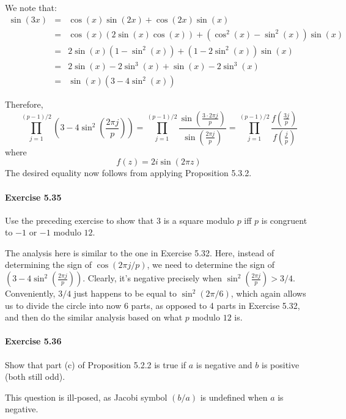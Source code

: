 \documentclass[notitlepage]{article}
\theoremstyle{definition}
\begin{document}
We note that:
\begin{eqnarray}
  \sin(3x) &=& \cos(x)\sin(2x) + \cos(2x)\sin(x) \\
  &=& \cos(x) (2 \sin(x) \cos(x)) + (\cos^2(x) - \sin^2(x)) \sin(x) \\
  &=& 2 \sin(x)(1 - \sin^2(x)) + (1 - 2 \sin^2(x)) \sin(x) \\
  &=& 2 \sin(x) - 2 \sin^3(x) + \sin(x) - 2\sin^3(x) \\
  &=& \sin(x) (3 - 4 \sin^2(x))
\end{eqnarray}

Therefore,
\begin{equation}
  \prod_{j=1}^{(p-1)/2} \left(3-4 \sin^2\left(\frac{2 \pi
    j}{p}\right)\right) = \prod_{j=1}^{(p-1)/2} \frac{\sin
    \left(\frac{3\cdot2 \pi j}{p}\right)} {\sin\left(\frac{2 \pi
      j}{p}\right)} = \prod_{j=1}^{(p-1)/2} \frac{f
    \left(\frac{3j}{p}\right)} {f\left(\frac{j}{p}\right)}
\end{equation}
where
\begin{equation}
  f(z) = 2 i \sin(2 \pi z)
\end{equation}
The desired equality now follows from applying Proposition 5.3.2.

\paragraph{Exercise 5.35}
Use the preceding exercise to show that $3$ is a square modulo $p$ iff
$p$ is congruent to $-1$ or $-1$ modulo $12$.

The analysis here is similar to the one in Exercise 5.32. Here,
instead of determining the sign of $\cos(2 \pi j/p)$, we need to
determine the sign of $\left(3-4 \sin^2\left(\frac{2 \pi
  j}{p}\right)\right)$. Clearly, it's negative precisely when $
\sin^2\left(\frac{2 \pi j}{p}\right) > 3/4$. Conveniently, $3/4$ just
happens to be equal to $\sin^2(2 \pi/6)$, which again allows us to
divide the circle into now 6 parts, as opposed to 4 parts in Exercise
5.32, and then do the similar analysis based on what $p$ modulo $12$
is. 

\paragraph{Exercise 5.36}
Show that part (c) of Proposition 5.2.2 is true if $a$ is negative and
$b$ is positive (both still odd).

This question is ill-posed, as Jacobi symbol $(b/a)$ is undefined when
$a$ is negative.
\end{document}
